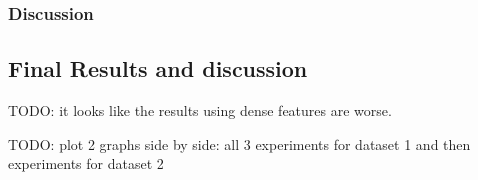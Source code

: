 \subsubsection{Discussion}

\subsection{Final Results and discussion}

{\color{red} TODO: it looks like the results using dense features are worse.}

{\color{red} TODO: plot 2 graphs side by side: all 3 experiments for dataset 1  and then experiments for dataset 2}